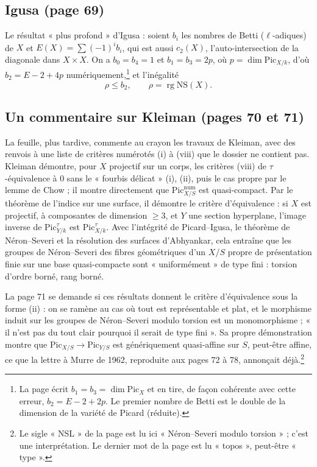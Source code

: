 \documentclass[11pt,a4paper]{article}
\begin{document}
\subsection*{Igusa (page 69)}

Le résultat « plus profond » d'Igusa : soient $b_i$ les nombres de Betti
($\ell$-adiques) de $X$ et $E(X) = \sum (-1)^i b_i$, qui est aussi $c_2(X)$,
l'auto-intersection de la diagonale dans $X \times X$. On a $b_0 = b_4 = 1$ et
$b_1 = b_3 = 2p$, où $p = \dim \mathrm{Pic}_{X/k}$, d'où
$b_2 = E - 2 + 4p$ numériquement,\footnote{La page écrit $b_1 = b_3 = \dim \mathrm{Pic}_X$ et en tire, de façon
cohérente avec cette erreur, $b_2 = E - 2 + 2p$. Le premier nombre de Betti
est le double de la dimension de la variété de Picard (réduite).} et l'inégalité
\[
\rho \leq b_2, \qquad \rho = \operatorname{rg} \mathrm{NS}(X) .
\]

\subsection*{Un commentaire sur Kleiman (pages 70 et 71)}

La feuille, plus tardive, commente au crayon les travaux de Kleiman, avec des
renvois à une liste de critères numérotés (i) à (viii) que le dossier ne
contient pas. Kleiman démontre, pour $X$ projectif sur un corps, les critères
(viii) de $\tau$-équivalence à $0$ sans le « fourbis délicat » (i), (ii), puis
le cas propre par le lemme de Chow ; il montre directement que
$\mathrm{Pic}^{\mathrm{num}}_{X/S}$ est quasi-compact. Par le théorème de
l'indice sur une surface, il démontre le critère d'équivalence : si $X$ est
projectif, à composantes de dimension $\geq 3$, et $Y$ une section
hyperplane, l'image inverse de $\mathrm{Pic}^\tau_{Y/k}$ est
$\mathrm{Pic}^\tau_{X/k}$. Avec l'intégrité de Picard--Igusa, le théorème de
Néron--Severi et la résolution des surfaces d'Abhyankar, cela entraîne que les
groupes de Néron--Severi des fibres géométriques d'un $X/S$ propre de
présentation finie sur une base quasi-compacte sont « uniformément » de type
fini : torsion d'ordre borné, rang borné.

La page 71 se demande si ces résultats donnent le critère d'équivalence sous la
forme (ii) : on se ramène au cas où tout est représentable et plat, et le
morphisme induit sur les groupes de Néron--Severi modulo torsion est un
monomorphisme ; « il n'est pas du tout clair pourquoi il serait de type fini ».
Sa propre démonstration montre que
$\mathrm{Pic}_{X/S} \to \mathrm{Pic}_{Y/S}$ est génériquement quasi-affine sur
$S$, peut-être affine, ce que la lettre à Murre de 1962, reproduite aux
pages 72 à 78, annonçait déjà.\footnote{Le sigle « NSL » de la page est lu ici « Néron--Severi modulo
torsion » ; c'est une interprétation. Le dernier mot de la page est lu
« topos », peut-être « type ».}
\end{document}
